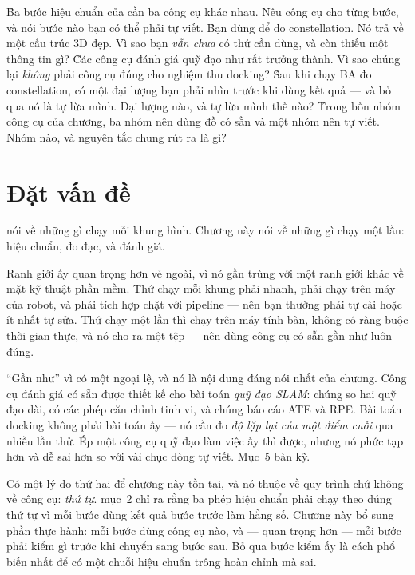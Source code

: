 \documentclass[../../marker.tex]{subfiles}
\begin{document}
\begin{khoigoi}
\h{Ba bước hiệu chuẩn của  cần ba công cụ khác nhau. Nêu công cụ cho từng bước, và nói bước nào bạn có thể phải tự viết.}
\h{Bạn dùng  để đo constellation. Nó trả về một cấu trúc 3D đẹp. Vì sao bạn \emph{vẫn chưa} có thứ cần dùng, và còn thiếu một thông tin gì?}
\h{Các công cụ đánh giá quỹ đạo như  rất trưởng thành. Vì sao chúng lại \emph{không} phải công cụ đúng cho nghiệm thu docking?}
\h{Sau khi chạy BA đo constellation, có một đại lượng bạn phải nhìn trước khi dùng kết quả --- và bỏ qua nó là tự lừa mình. Đại lượng nào, và tự lừa mình thế nào?}
\h{Trong bốn nhóm công cụ của chương, ba nhóm nên dùng đồ có sẵn và một nhóm nên tự viết. Nhóm nào, và nguyên tắc chung rút ra là gì?}
\end{khoigoi}

\section{Đặt vấn đề}

 nói về những gì chạy mỗi khung hình. Chương này nói về những gì chạy một lần: hiệu chuẩn, đo đạc, và đánh giá.

Ranh giới ấy quan trọng hơn vẻ ngoài, vì nó gần trùng với một ranh giới khác về mặt kỹ thuật phần mềm. Thứ chạy mỗi khung phải nhanh, phải chạy trên máy của robot, và phải tích hợp chặt với pipeline --- nên bạn thường phải tự cài hoặc ít nhất tự sửa. Thứ chạy một lần thì chạy trên máy tính bàn, không có ràng buộc thời gian thực, và nó cho ra một tệp --- nên dùng công cụ có sẵn gần như luôn đúng.

``Gần như'' vì có một ngoại lệ, và nó là nội dung đáng nói nhất của chương. Công cụ đánh giá có sẵn được thiết kế cho bài toán \emph{quỹ đạo SLAM}: chúng so hai quỹ đạo dài, có các phép căn chỉnh tinh vi, và chúng báo cáo ATE và RPE. Bài toán docking không phải bài toán ấy --- nó cần đo \emph{độ lặp lại của một điểm cuối} qua nhiều lần thử. Ép một công cụ quỹ đạo làm việc ấy thì được, nhưng nó phức tạp hơn và dễ sai hơn so với vài chục dòng tự viết. Mục~5 bàn kỹ.

Có một lý do thứ hai để chương này tồn tại, và nó thuộc về quy trình chứ không về công cụ: \emph{thứ tự}.  mục~2 chỉ ra rằng ba phép hiệu chuẩn phải chạy theo đúng thứ tự vì mỗi bước dùng kết quả bước trước làm hằng số. Chương này bổ sung phần thực hành: mỗi bước dùng công cụ nào, và --- quan trọng hơn --- mỗi bước phải kiểm gì trước khi chuyển sang bước sau. Bỏ qua bước kiểm ấy là cách phổ biến nhất để có một chuỗi hiệu chuẩn trông hoàn chỉnh mà sai.
\end{document}
